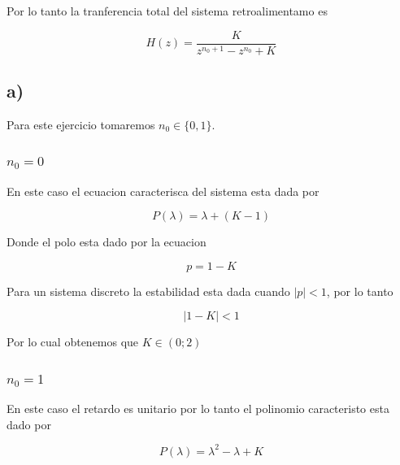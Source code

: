 \documentclass{article}
\begin{document}
            Por lo tanto la tranferencia total del sistema retroalimentamo es 

            \begin{equation}
                H(z) = \frac{K}{z^{n_0+1} - z^{n_0} + K }
            \end{equation}

            \subsection{a)}

                Para este ejercicio tomaremos $n_0 \in \{0,1\}$.

                \subsubsection{$n_0=0$}

                    En este caso el ecuacion caracterisca del sistema esta dada por 

                    \begin{equation}
                        P(\lambda) = \lambda + ( K -1 )
                    \end{equation}

                    Donde el polo esta dado por la ecuacion 

                    \begin{equation}
                        p = 1 - K
                    \end{equation}

                    Para un sistema discreto la estabilidad esta dada cuando $|p|<1$, por lo tanto 

                    \begin{equation}
                        |1 - K| < 1
                    \end{equation}

                    Por lo cual obtenemos que $K \in ( 0 ; 2 )$

                \subsubsection{$n_0=1$}

                    En este caso el retardo es unitario por lo tanto el polinomio caracteristo esta dado por 

                    \begin{equation}
                        P(\lambda) = \lambda^2 - \lambda + K
                    \end{equation}
\end{document}
